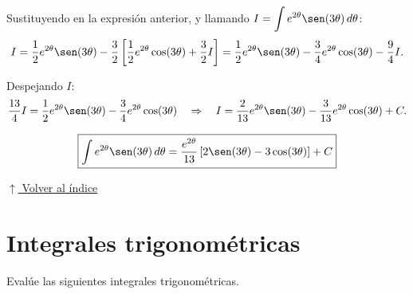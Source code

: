 \documentclass[12pt]{article}
\newcommand{\volverindice}{%
    \vspace{1em}%
    \begin{flushright}%
        \hyperlink{indice}{\small $\uparrow$ Volver al índice}%
    \end{flushright}%
}
\begin{document}
\begin{enumerate}[label=\alph*.-]
    Sustituyendo en la expresión anterior, y llamando
    $I=\displaystyle\int e^{2\theta}\sen(3\theta)\,d\theta$:
    \[
    I=\frac12e^{2\theta}\sen(3\theta)
    -\frac32\left[\frac12e^{2\theta}\cos(3\theta)+\frac32 I\right]
    =\frac12e^{2\theta}\sen(3\theta)-\frac34e^{2\theta}\cos(3\theta)-\frac94I.
    \]

    Despejando $I$:
    \[
    \frac{13}{4}I=\frac12e^{2\theta}\sen(3\theta)-\frac34e^{2\theta}\cos(3\theta)
    \quad\Rightarrow\quad
    I=\frac{2}{13}e^{2\theta}\sen(3\theta)-\frac{3}{13}e^{2\theta}\cos(3\theta)+C.
    \]

    \[
    \boxed{
    \int e^{2\theta}\sen(3\theta)\,d\theta
    =\frac{e^{2\theta}}{13}\left[2\sen(3\theta)-3\cos(3\theta)\right]+C
    }
    \]

\end{enumerate}

\volverindice
\newpage


\section{Integrales trigonométricas}

Evalúe las siguientes integrales trigonométricas.
\end{document}
